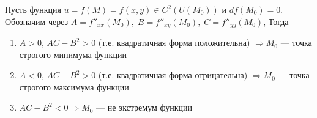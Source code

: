     \begin{Th}
        Пусть функция $u = f(M) = f(x, y) \in C^2(U(M_0))$ и $df(M_0) = 0$.\\
        Обозначим через $A = f''_{xx}(M_0), \; B = f''_{xy}(M_0), \; C = f''_{yy}(M_0)$, Тогда
        \begin{enumerate}
            \item $A > 0, \, AC - B^2 > 0 $ (т.е. квадратичная форма положительна) $ \Rightarrow M_0$ --- точка строгого минимума функции
            \item $A < 0, \, AC - B^2 > 0 $ (т.е. квадратичная форма отрицательна) $ \Rightarrow M_0$ --- точка строгого максимума функции
            \item $AC - B^2 < 0 \Rightarrow M_0$ --- не экстремум функции
        \end{enumerate}
    \end{Th}
